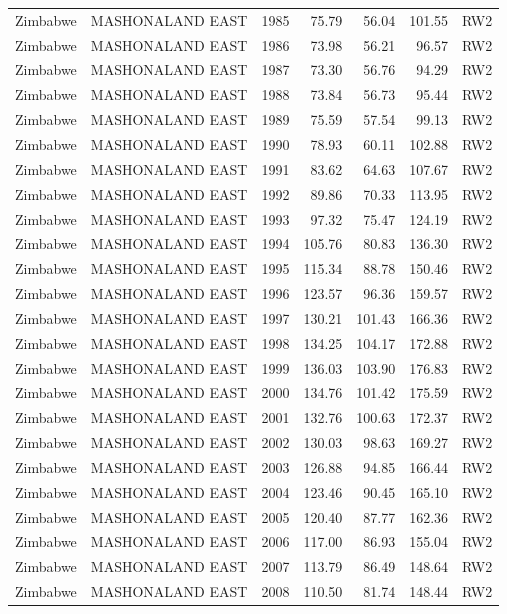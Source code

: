 \begin{longtable}{lllrrrl}
  Zimbabwe & MASHONALAND EAST & 1985 & 75.79 & 56.04 & 101.55 & RW2 \\ 
  Zimbabwe & MASHONALAND EAST & 1986 & 73.98 & 56.21 & 96.57 & RW2 \\ 
  Zimbabwe & MASHONALAND EAST & 1987 & 73.30 & 56.76 & 94.29 & RW2 \\ 
  Zimbabwe & MASHONALAND EAST & 1988 & 73.84 & 56.73 & 95.44 & RW2 \\ 
  Zimbabwe & MASHONALAND EAST & 1989 & 75.59 & 57.54 & 99.13 & RW2 \\ 
  Zimbabwe & MASHONALAND EAST & 1990 & 78.93 & 60.11 & 102.88 & RW2 \\ 
  Zimbabwe & MASHONALAND EAST & 1991 & 83.62 & 64.63 & 107.67 & RW2 \\ 
  Zimbabwe & MASHONALAND EAST & 1992 & 89.86 & 70.33 & 113.95 & RW2 \\ 
  Zimbabwe & MASHONALAND EAST & 1993 & 97.32 & 75.47 & 124.19 & RW2 \\ 
  Zimbabwe & MASHONALAND EAST & 1994 & 105.76 & 80.83 & 136.30 & RW2 \\ 
  Zimbabwe & MASHONALAND EAST & 1995 & 115.34 & 88.78 & 150.46 & RW2 \\ 
  Zimbabwe & MASHONALAND EAST & 1996 & 123.57 & 96.36 & 159.57 & RW2 \\ 
  Zimbabwe & MASHONALAND EAST & 1997 & 130.21 & 101.43 & 166.36 & RW2 \\ 
  Zimbabwe & MASHONALAND EAST & 1998 & 134.25 & 104.17 & 172.88 & RW2 \\ 
  Zimbabwe & MASHONALAND EAST & 1999 & 136.03 & 103.90 & 176.83 & RW2 \\ 
  Zimbabwe & MASHONALAND EAST & 2000 & 134.76 & 101.42 & 175.59 & RW2 \\ 
  Zimbabwe & MASHONALAND EAST & 2001 & 132.76 & 100.63 & 172.37 & RW2 \\ 
  Zimbabwe & MASHONALAND EAST & 2002 & 130.03 & 98.63 & 169.27 & RW2 \\ 
  Zimbabwe & MASHONALAND EAST & 2003 & 126.88 & 94.85 & 166.44 & RW2 \\ 
  Zimbabwe & MASHONALAND EAST & 2004 & 123.46 & 90.45 & 165.10 & RW2 \\ 
  Zimbabwe & MASHONALAND EAST & 2005 & 120.40 & 87.77 & 162.36 & RW2 \\ 
  Zimbabwe & MASHONALAND EAST & 2006 & 117.00 & 86.93 & 155.04 & RW2 \\ 
  Zimbabwe & MASHONALAND EAST & 2007 & 113.79 & 86.49 & 148.64 & RW2 \\ 
  Zimbabwe & MASHONALAND EAST & 2008 & 110.50 & 81.74 & 148.44 & RW2 \\ 

\end{longtable}
